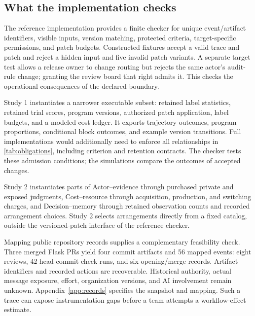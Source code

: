 \subsection{What the implementation checks}
The reference implementation provides a finite checker for unique event/artifact identifiers, visible inputs, version matching, protected criteria, target-specific permissions, and patch budgets. Constructed fixtures accept a valid trace and patch and reject a hidden input and five invalid patch variants. A separate target test allows a release owner to change routing but rejects the same actor's audit-rule change; granting the review board that right admits it. This checks the operational consequences of the declared boundary.

Study 1 instantiates a narrower executable subset: retained label statistics, retained trial scores, program versions, authorized patch application, label budgets, and a modeled cost ledger. It exports trajectory outcomes, program proportions, conditional block outcomes, and example version transitions. Full implementations would additionally need to enforce all relationships in \cref{tab:obligations}, including criterion and retention contracts. The checker tests these admission conditions; the simulations compare the outcomes of accepted changes.

Study 2 instantiates parts of Actor--evidence through purchased private and exposed judgments, Cost--resource through acquisition, production, and switching charges, and Decision--memory through retained observation counts and recorded arrangement choices. Study 2 selects arrangements directly from a fixed catalog, outside the versioned-patch interface of the reference checker.

Mapping public repository records supplies a complementary feasibility check. Three merged Flask PRs yield four commit artifacts and 56 mapped events: eight reviews, 42 head-commit check runs, and six opening/merge records. Artifact identifiers and recorded actions are recoverable. Historical authority, actual message exposure, effort, organization versions, and AI involvement remain unknown. Appendix~\ref{app:records} specifies the snapshot and mapping. Such a trace can expose instrumentation gaps before a team attempts a workflow-effect estimate.
